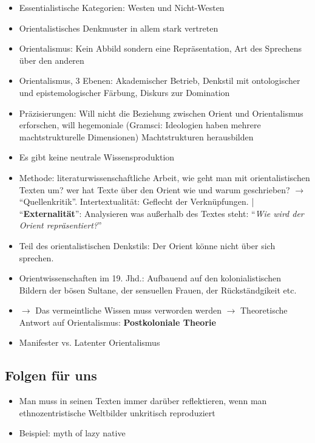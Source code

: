 \documentclass[emulatestandardclasses]{scrartcl}
\begin{document}
\begin{itemize}
  \item Essentialistische Kategorien: Westen und Nicht-Westen
  \item Orientalistisches Denkmuster in allem stark vertreten
  \item Orientalismus: Kein Abbild sondern eine Repräsentation, Art des Sprechens über den anderen
  \item Orientalismus, 3 Ebenen: Akademischer Betrieb, Denkstil mit ontologischer und epistemologischer Färbung, Diskurs zur Domination
  \item Präzisierungen: Will nicht die Beziehung zwischen Orient und Orientalismus erforschen, will hegemoniale (Gramsci: Ideologien haben mehrere machtstrukturelle Dimensionen) Machtstrukturen herausbilden
  \item Es gibt keine neutrale Wissensproduktion
  \item Methode: literaturwissenschaftliche Arbeit, wie geht man mit orientalistischen Texten um? wer hat Texte über den Orient wie und warum geschrieben? $\rightarrow$ "`Quellenkritik"'. Intertextualität: Geflecht der Verknüpfungen. | "`\textbf{Externalität}"': Analysieren was außerhalb des Textes steht: "`\emph{Wie wird der Orient repräsentiert?}"'
  \item Teil des orientalistischen Denkstils: Der Orient könne nicht über sich sprechen.
  \item Orientwissenschaften im 19. Jhd.: Aufbauend auf den kolonialistischen Bildern der bösen Sultane, der sensuellen Frauen, der Rückständgikeit etc.
  \item $\rightarrow$ Das vermeintliche Wissen muss verworden werden $\rightarrow$ Theoretische Antwort auf Orientalismus: \textbf{Postkoloniale Theorie}
  \item Manifester vs. Latenter Orientalismus
\end{itemize}

\subsection{Folgen für uns}

\begin{itemize}
  \item Man muss in seinen Texten immer darüber reflektieren, wenn man ethnozentristische Weltbilder unkritisch reproduziert
  \item  Beispiel: myth of lazy native 
\end{itemize}
\end{document}
